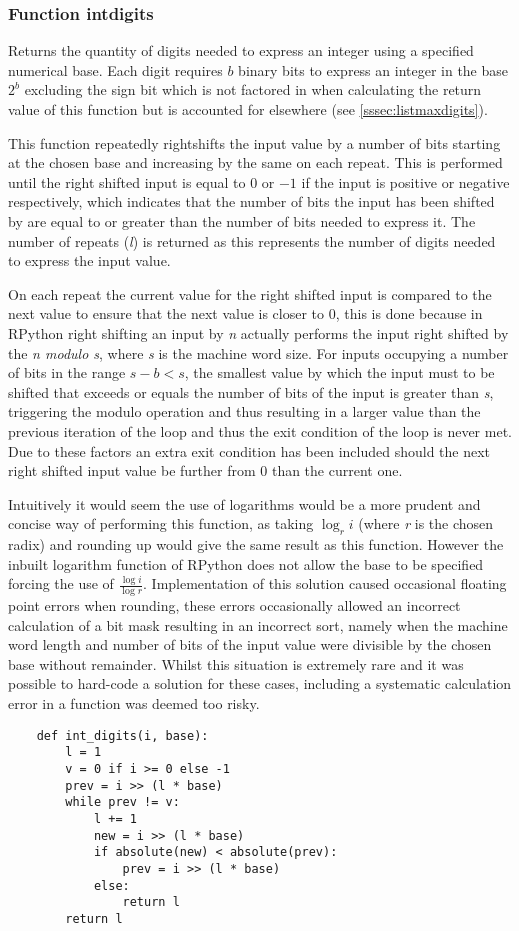 \documentclass[12pt]{article}
\begin{document}
\pagebreak
\subsubsection{Function int\textunderscore digits}
\label{ssec:intdigits}
Returns the quantity of digits needed to express an integer using a specified numerical base. Each digit requires $b$ binary bits to express an integer in the base $2^b$ excluding the sign bit which is not factored in when calculating the return value of this function but is accounted for elsewhere (see \ref{sssec:listmaxdigits}).
\par
This function repeatedly rightshifts the input value by a number of bits starting at the chosen base and increasing by the same on each repeat. This is performed until the right shifted input is equal to $0$ or $-1$ if the input is positive or negative respectively, which indicates that the number of bits the input has been shifted by are equal to or greater than the number of bits needed to express it. The number of repeats (\textit{l}) is returned as this represents the number of digits needed to express the input value.
\par
On each repeat the current value for the right shifted input is compared to the next value to ensure that the next value is closer to $0$, this is done because in RPython right shifting an input by \textit{n} actually performs the input right shifted by the \textit{n modulo s}, where \textit{s} is the machine word size. For inputs occupying a number of bits in the range $s-b < s$, the smallest value by which the input must to be shifted that exceeds or equals the number of bits of the input is greater than \textit{s}, triggering the modulo operation and thus resulting in a larger value than the previous iteration of the loop and thus the exit condition of the loop is never met. Due to these factors an extra exit condition has been included should the next right shifted input value be further from 0 than the current one.
\par
Intuitively it would seem the use of logarithms would be a more prudent and concise way of performing this function, as taking $\log _{r} i$ (where \textit{r} is the chosen radix) and rounding up would give the same result as this function. However the inbuilt logarithm function of RPython does not allow the base to be specified forcing the use of $\frac{\log i}{\log r}$. Implementation of this solution caused occasional floating point errors when rounding, these errors occasionally allowed an incorrect calculation of a bit mask resulting in an incorrect sort, namely when the machine word length and number of bits of the input value were divisible by the chosen base without remainder. Whilst this situation is extremely rare and it was possible to hard-code a solution for these cases, including a systematic calculation error in a function was deemed too risky.
\begin{lstlisting}
	def int_digits(i, base):
		l = 1
		v = 0 if i >= 0 else -1
		prev = i >> (l * base)
		while prev != v:
			l += 1
			new = i >> (l * base)
			if absolute(new) < absolute(prev):
				prev = i >> (l * base)
			else:
				return l
		return l
\end{lstlisting}
\pagebreak
\end{document}

